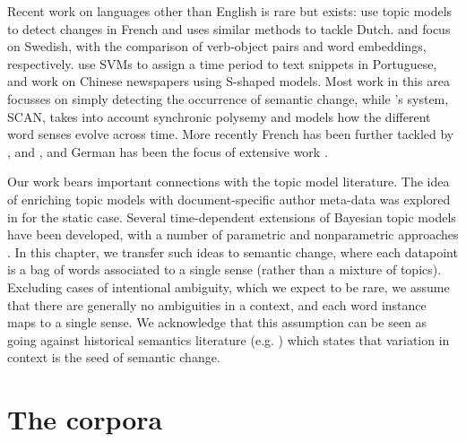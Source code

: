 \documentclass[output=paper%
]{langscibook}
\begin{document}
Recent work on languages other than English is rare but exists: \citet{falk2014quenelle} use topic models to detect changes in French and \citet{hengchen2017does} uses similar methods to tackle Dutch. 
\citet{cavallin-2012} and \citet{tahmasebi2018study} focus on Swedish, with the comparison of verb-object pairs and word embeddings, respectively.
\citet{zampieri2016modeling} use SVMs to assign a time period to text snippets in Portuguese, and \citet{tang2016} work on Chinese newspapers using S-shaped models. 
Most work in this area focusses on simply detecting the occurrence of semantic change, while  \citet{frermann-lapata-2016-bayesian}'s system, SCAN, takes into account synchronic polysemy and models how the different word senses evolve across time. 
More recently French has been further tackled by \citet{jawahar-seddah-2019-contextualized}, \citet{frossard-etal-2020-dataset} and \citet{montariol-allauzen-2020-etude}, and German has been the focus of extensive work \citep{schlechtweg-etal-2017-german,schlechtweg2018durel,schlechtweg-etal-2019-wind,schlechtweg-etal-2020-semeval}.

Our work bears important connections with the topic model literature. The idea of enriching topic models with document-specific author meta-data was explored in \citet{rosen-zvi2004} for the static case. Several time-dependent extensions of Bayesian topic models have been developed, with a number of parametric and nonparametric approaches \citep{blei2006dynamic, gamma, xing, topictime, perrone2017}. In this chapter, we transfer such ideas to semantic change, where each datapoint is a bag of words associated to a single sense (rather than a mixture of topics). Excluding cases of intentional ambiguity, which we expect to be rare, we assume that there are generally no ambiguities in a context, and each word instance maps to a single sense. We acknowledge that this assumption can be seen as going against historical semantics literature (e.g. \citealt{traugott2001regularity}) which states that variation in context is the seed of semantic change.



\section{The corpora}\label{sec:data}
\end{document}
